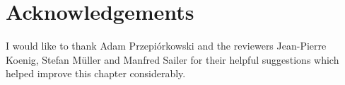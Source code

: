 \documentclass[output=paper
 	        ,biblatex
                ,babelshorthands
                ,newtxmath
                ,draftmode
                ,colorlinks, citecolor=brown
]{langscibook}
\begin{document}









\section*{Acknowledgements}

I would like to thank Adam Przepi\'orkowski and the reviewers
Jean-Pierre Koenig, Stefan M\"uller and Manfred Sailer for their
helpful suggestions which helped improve this chapter considerably.


{\sloppy
\printbibliography[heading=subbibliography,notkeyword=this]
}
\end{document}
